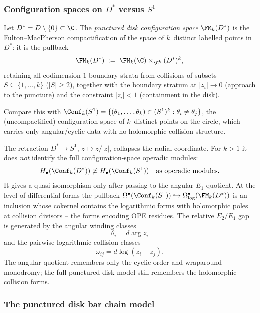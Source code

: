 \subsubsection{\texorpdfstring{Configuration spaces on $D^*$ versus $S^1$}{Configuration spaces on punctured D versus S1}}

\begin{definition}%
\label{def:punctured-disk-config}%
%
%
Let $D^*=D\setminus\{0\}\subset\C$.
The \emph{punctured disk configuration space}
$\FM_k(D^*)$ is the Fulton--MacPherson
compactification of the space of $k$~distinct
labelled points in~$D^*$: it is the pullback
\[
\FM_k(D^*)
\;:=\;
\FM_k(\C)\times_{\C^k}(D^*)^k,
\]
retaining all codimension-$1$ boundary strata from
collisions of subsets $S\subseteq\{1,\ldots,k\}$
($|S|\ge 2$), together with the boundary stratum
at $|z_i|\to 0$ (approach to the puncture) and
the constraint $|z_i|<1$ (containment in the disk).

Compare this with
$\Conf_k(S^1)=\{(\theta_1,\ldots,\theta_k)\in
(S^1)^k:\theta_i\neq\theta_j\}$,
the (uncompactified) configuration space of $k$~distinct
points on the circle, which carries only angular/cyclic
data with no holomorphic collision structure.
\end{definition}

The retraction $D^*\to S^1$, $z\mapsto z/|z|$, collapses the
radial coordinate. For \(k>1\) it does \emph{not} identify the full
configuration-space operadic modules:
\[
H_\bullet(\Conf_k(D^*))\not\simeq H_\bullet(\Conf_k(S^1))
\quad\text{as operadic modules}.
\]
It gives a quasi-isomorphism only after passing to the angular
\(E_1\)-quotient. At the level of differential forms the pullback
$\Omega^\bullet(\Conf_k(S^1))\hookrightarrow
\Omega^\bullet_{\log}(\FM_k(D^*))$ is an inclusion whose
cokernel contains the logarithmic forms with holomorphic poles
at collision divisors -- the forms encoding OPE residues. The
relative \(E_2/E_1\) gap is generated by the angular winding classes
\[
\theta_i=d\arg z_i
\]
and the pairwise logarithmic collision classes
\[
\omega_{ij}=d\log(z_i-z_j).
\]
The angular quotient remembers only the cyclic order and wraparound
monodromy; the full punctured-disk model still remembers the
holomorphic collision forms.

\subsubsection{The punctured disk bar chain model}

